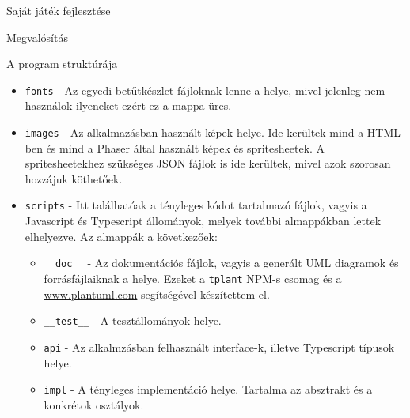 \begin{MyChapter}{Saját játék fejlesztése}
\begin{MySection}{Megvalósítás}
\begin{MySubSection}{A program struktúrája}
\begin{itemize}
				\item \texttt{fonts} - Az egyedi betűtkészlet fájloknak lenne a helye, mivel jelenleg nem használok ilyeneket ezért ez a mappa üres.
				
				\item \texttt{images} - Az alkalmazásban használt képek helye. Ide kerültek mind a HTML-ben és mind a Phaser által használt képek és spritesheetek. A spritesheetekhez szükséges JSON fájlok is ide kerültek, mivel azok szorosan hozzájuk köthetőek.
				
				\item \texttt{scripts} - Itt találhatóak a tényleges kódot tartalmazó fájlok, vagyis a Javascript és Typescript állományok, melyek további almappákban lettek elhelyezve. Az almappák a következőek:
				\begin{itemize}
					\item \texttt{\_\_doc\_\_} - Az dokumentációs fájlok, vagyis a generált UML diagramok és forrásfájlaiknak a helye. Ezeket a \texttt{tplant} NPM-s csomag és a \url{www.plantuml.com} segítségével készítettem el.
					
					\item \texttt{\_\_test\_\_} - A tesztállományok helye.
					
					\item \texttt{api} - Az alkalmzásban felhasznált interface-k, illetve Typescript típusok helye.
					
					\item \texttt{impl} - A tényleges implementáció helye. Tartalma az absztrakt és a konkrétok osztályok.
				\end{itemize}
			\end{itemize}
		\end{MySubSection}
		

\end{MySection}
\end{MyChapter}
